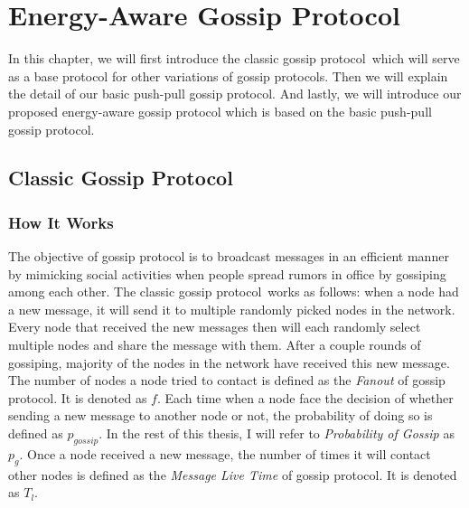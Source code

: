 \documentclass[onehalf,11pt]{beavtex}
\newcommand{\gp}{gossip protocol}
\newcommand{\pog}{Probability of Gossip}
\begin{document}



\chapter{Energy-Aware Gossip Protocol}
\label{Chapter3}

In this chapter, we will first introduce the classic \gp ~which will serve as a base protocol for other variations of gossip protocols. Then we will explain the detail of our basic push-pull \gp. And lastly, we will introduce our proposed energy-aware gossip protocol which is based on the basic push-pull \gp.

\section{Classic Gossip Protocol}
\subsection{How It Works} \label{basic gossip}

The objective of gossip protocol is to broadcast messages in an efficient manner by mimicking social activities when people spread rumors in office by gossiping among each other. The classic \gp ~works as follows: when a node had a new message, it will send it to multiple randomly picked nodes in the network. Every node that received the new messages then will each randomly select multiple nodes and share the message with them. After a couple rounds of gossiping, majority of the nodes in the network have received this new message. The number of nodes a node tried to contact is defined as the \emph{Fanout} of \gp. It is denoted as $f$. Each time when a node face the decision of whether sending a new message to another node or not, the probability of doing so is defined as $p_{gossip}$. In the rest of this thesis, I will refer to \emph{\pog} as $p_g$. Once a node received a new message, the number of times it will contact other nodes is defined as the \emph{Message Live Time} of \gp. It is denoted as $T_l$.
\end{document}
